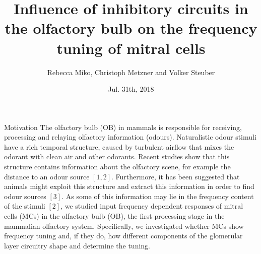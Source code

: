 \documentclass[final,hyperref={pdfpagelabels=false}]{beamer}
\title{Influence of inhibitory circuits in the olfactory bulb on the frequency tuning of mitral cells}
\author[Miko]{Rebecca Miko, Christoph Metzner and Volker Steuber}
\institute{University of Hertfordshire, AL10 9AB, UK}
\date{Jul. 31th, 2018}
\begin{document}
\begin{frame}{} 
\begin{block}{Motivation}
The olfactory bulb (OB) in mammals is responsible for receiving, processing and relaying olfactory information (odours). 
Naturalistic odour stimuli have a rich temporal structure, caused by turbulent airflow that mixes the odorant with clean air and other odorants. 
Recent studies show that this structure contains information about the olfactory scene, for example the distance to an odour source $[1,2]$. 
Furthermore, it has been suggested that animals might exploit this structure and extract this information in order to find odour sources $[3]$. 
As some of this information may lie in the frequency content of the stimuli $[2]$, we studied input frequency dependent responses of mitral cells (MCs) in the olfactory bulb (OB), the first processing stage in the mammalian olfactory system.
Specifically, we investigated whether MCs show frequency tuning and, if they do, how different components of the glomerular layer circuitry shape and determine the tuning.
\end{block}
    
    
\begin{columns}[t]
\begin{column}{.48\linewidth}


\end{column}
\end{columns}
\end{frame}
\end{document}
